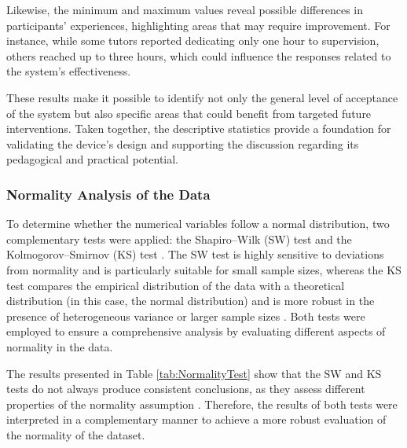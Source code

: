                Likewise, the minimum and maximum values reveal possible differences in participants’ experiences, highlighting areas that may require improvement. For instance, while some tutors reported dedicating only one hour to supervision, others reached up to three hours, which could influence the responses related to the system’s effectiveness.
                
                These results make it possible to identify not only the general level of acceptance of the system but also specific areas that could benefit from targeted future interventions. Taken together, the descriptive statistics provide a foundation for validating the device’s design and supporting the discussion regarding its pedagogical and practical potential.
                
                \subsubsection{Normality Analysis of the Data}
                To determine whether the numerical variables follow a normal distribution, two complementary tests were applied: the Shapiro–Wilk (SW) test and the Kolmogorov–Smirnov (KS) test \citep{Correa2025Simulation}. The SW test is highly sensitive to deviations from normality and is particularly suitable for small sample sizes, whereas the KS test compares the empirical distribution of the data with a theoretical distribution (in this case, the normal distribution) and is more robust in the presence of heterogeneous variance or larger sample sizes \citep{Kobayashi2025Testing}. Both tests were employed to ensure a comprehensive analysis by evaluating different aspects of normality in the data.
                
                The results presented in Table \ref{tab:NormalityTest} show that the SW and KS tests do not always produce consistent conclusions, as they assess different properties of the normality assumption \citep{Correa2025Simulation}. Therefore, the results of both tests were interpreted in a complementary manner to achieve a more robust evaluation of the normality of the dataset.
                
